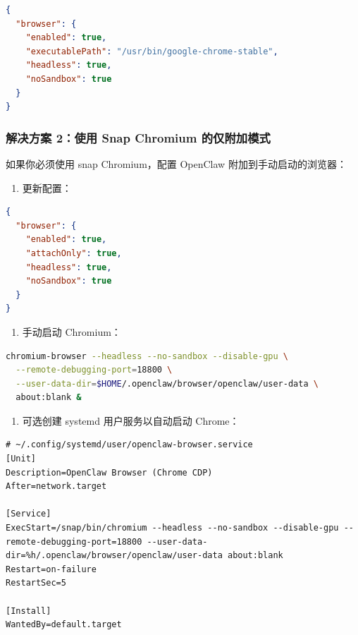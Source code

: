 \begin{lstlisting}[language=json]
{
  "browser": {
    "enabled": true,
    "executablePath": "/usr/bin/google-chrome-stable",
    "headless": true,
    "noSandbox": true
  }
}
\end{lstlisting}


\subsubsection{解决方案 2：使用 Snap Chromium 的仅附加模式}


如果你必须使用 snap Chromium，配置 OpenClaw 附加到手动启动的浏览器：

\begin{enumerate}
  \item 更新配置：
\end{enumerate}


\begin{lstlisting}[language=json]
{
  "browser": {
    "enabled": true,
    "attachOnly": true,
    "headless": true,
    "noSandbox": true
  }
}
\end{lstlisting}


\begin{enumerate}
  \item 手动启动 Chromium：
\end{enumerate}


\begin{lstlisting}[language=bash]
chromium-browser --headless --no-sandbox --disable-gpu \
  --remote-debugging-port=18800 \
  --user-data-dir=$HOME/.openclaw/browser/openclaw/user-data \
  about:blank &
\end{lstlisting}


\begin{enumerate}
  \item 可选创建 systemd 用户服务以自动启动 Chrome：
\end{enumerate}


\begin{lstlisting}
# ~/.config/systemd/user/openclaw-browser.service
[Unit]
Description=OpenClaw Browser (Chrome CDP)
After=network.target

[Service]
ExecStart=/snap/bin/chromium --headless --no-sandbox --disable-gpu --remote-debugging-port=18800 --user-data-dir=%h/.openclaw/browser/openclaw/user-data about:blank
Restart=on-failure
RestartSec=5

[Install]
WantedBy=default.target
\end{lstlisting}


